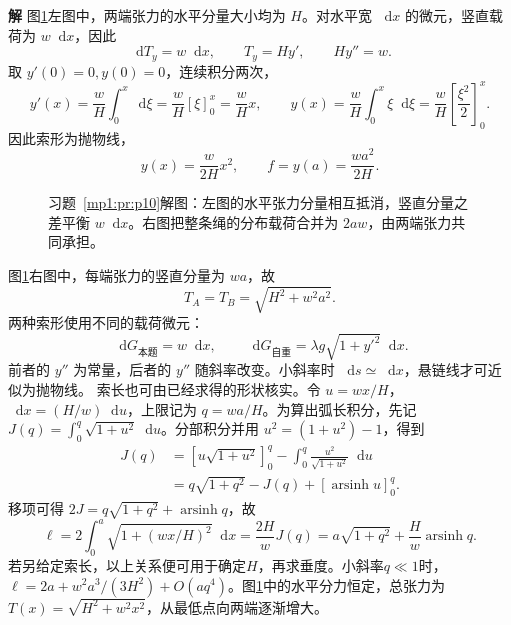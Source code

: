 \documentclass[11pt,openany,fontset=fandol]{ctexbook}
\theoremstyle{definition}\newtheorem{example}{例}[chapter]\newtheorem{exercise}{习题}[chapter]
\newcommand{\SolutionStart}{\par\medskip\ifdim\pagetotal>0pt\ifdim\dimexpr\pagegoal-\pagetotal\relax<3\baselineskip\newpage\fi\fi\noindent\textbf{解}\quad\ignorespaces}
\newenvironment{solution}{\SolutionStart}{\par\medskip}
\newcommand{\dd}{\mathop{}\!\mathrm d}\newcommand{\ee}{\mathrm e}\newcommand{\vct}[1]{\bm{#1}}
\begin{document}
\begin{solution}
图\ref{mp1:fig:p10-s}左图中，两端张力的水平分量大小均为 $H$。对水平宽 $\dd x$ 的微元，竖直载荷为 $w\dd x$，因此
\[
\dd T_y=w\dd x,\qquad T_y=Hy',\qquad Hy''=w.
\]
取 $y'(0)=0,y(0)=0$，连续积分两次，
\[
y'(x)=\frac wH\int_0^x\dd\xi=\frac wH[\xi]_0^x=\frac wHx,
\qquad
y(x)=\frac wH\int_0^x\xi\dd\xi=\frac wH\left[\frac{\xi^2}{2}\right]_0^x.
\]
因此索形为抛物线，
\[
y(x)=\frac w{2H}x^2,\qquad f=y(a)=\frac{wa^2}{2H}.
\]

\begin{figure}[H]\centering

\caption{习题~\ref{mp1:pr:p10}解图：左图的水平张力分量相互抵消，竖直分量之差平衡 $w\dd x$。右图把整条绳的分布载荷合并为 $2aw$，由两端张力共同承担。}\label{mp1:fig:p10-s}
\end{figure}

图\ref{mp1:fig:p10-s}右图中，每端张力的竖直分量为 $wa$，故
\[
T_A=T_B=\sqrt{H^2+w^2a^2}.
\]
两种索形使用不同的载荷微元：
\[
\dd G_{\text{本题}}=w\dd x,\qquad
\dd G_{\text{自重}}=\lambda g\sqrt{1+y'^2}\dd x.
\]
前者的 $y''$ 为常量，后者的 $y''$ 随斜率改变。小斜率时 $\dd s\simeq\dd x$，悬链线才可近似为抛物线。
索长也可由已经求得的形状核实。令 $u=wx/H$，$\dd x=(H/w)\dd u$，上限记为 $q=wa/H$。为算出弧长积分，先记 $J(q)=\int_0^q\sqrt{1+u^2}\dd u$。分部积分并用 $u^2=(1+u^2)-1$，得到
\[
\begin{aligned}
J(q)&=[u\sqrt{1+u^2}]_0^q-\int_0^q\frac{u^2}{\sqrt{1+u^2}}\dd u\\
&=q\sqrt{1+q^2}-J(q)+[\operatorname{arsinh}u]_0^q.
\end{aligned}
\]
移项可得 $2J=q\sqrt{1+q^2}+\operatorname{arsinh}q$，故
\[
 \ell=2\int_0^a\sqrt{1+(wx/H)^2}\dd x
 =\frac{2H}{w}J(q)
 =a\sqrt{1+q^2}+\frac Hw\operatorname{arsinh}q.
\]
若另给定索长，以上关系便可用于确定$H$，再求垂度。小斜率$q\ll1$时，$\ell=2a+w^2a^3/(3H^2)+O(aq^4)$。图\ref{mp1:fig:p10-s}中的水平分力恒定，总张力为$T(x)=\sqrt{H^2+w^2x^2}$，从最低点向两端逐渐增大。
\end{solution}
\end{document}
